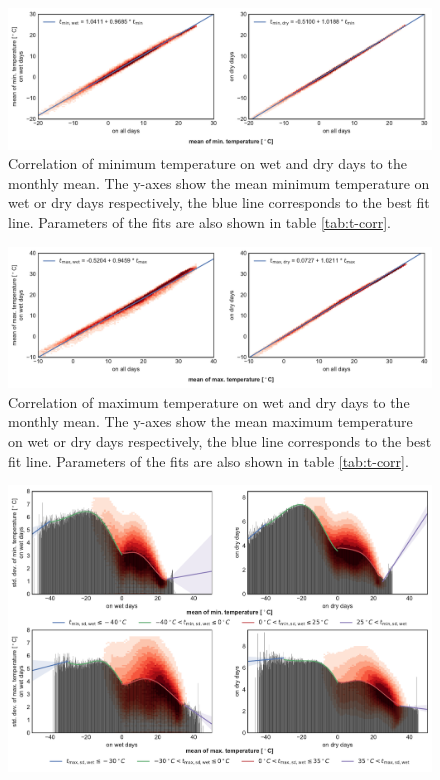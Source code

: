 \begin{refsection}
\begin{figure}
	\includegraphics[width=12cm]{Figures/f05.pdf}
	\caption[Correlation of minimum temperature on wet and dry days to the monthly mean]{Correlation of minimum temperature on wet and dry days to the monthly mean. The y-axes show the mean minimum temperature on wet or dry days respectively, the blue line corresponds to the best fit line. Parameters of the fits are also shown in table \ref{tab:t-corr}.}
	\label{fig:tmin}
\end{figure}
\begin{figure}
	\includegraphics[width=12cm]{Figures/f06.pdf}
	\caption[Correlation of maximum temperature on wet and dry days to the monthly mean]{Correlation of maximum temperature on wet and dry days to the monthly mean. The y-axes show the mean maximum temperature on wet or dry days respectively, the blue line corresponds to the best fit line. Parameters of the fits are also shown in table \ref{tab:t-corr}.}
	\label{fig:tmax}
\end{figure}
\begin{figure}
	\includegraphics[width=12cm]{Figures/f07.pdf}

\end{figure}
\end{refsection}
